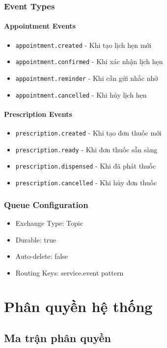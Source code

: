 \documentclass[12pt,a4paper]{report}
\begin{document}
\subsection{Event Types}
\subsubsection{Appointment Events}
\begin{itemize}
    \item \texttt{appointment.created} - Khi tạo lịch hẹn mới
    \item \texttt{appointment.confirmed} - Khi xác nhận lịch hẹn
    \item \texttt{appointment.reminder} - Khi cần gửi nhắc nhở
    \item \texttt{appointment.cancelled} - Khi hủy lịch hẹn
\end{itemize}

\subsubsection{Prescription Events}
\begin{itemize}
    \item \texttt{prescription.created} - Khi tạo đơn thuốc mới
    \item \texttt{prescription.ready} - Khi đơn thuốc sẵn sàng
    \item \texttt{prescription.dispensed} - Khi đã phát thuốc
    \item \texttt{prescription.cancelled} - Khi hủy đơn thuốc
\end{itemize}

\subsection{Queue Configuration}
\begin{itemize}
    \item Exchange Type: Topic
    \item Durable: true
    \item Auto-delete: false
    \item Routing Keys: service.event pattern
\end{itemize}

\chapter{Phân quyền hệ thống}

\section{Ma trận phân quyền}
\end{document}
